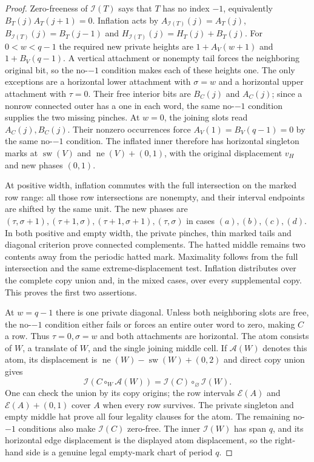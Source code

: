 \documentclass[11pt,a4paper]{amsart}
\numberwithin{equation}{section}
\theoremstyle{plain}
\theoremstyle{definition}
\begin{document}
\begin{proof}
Zero-freeness of \(\mathcal I(T)\) says that \(T\) has no index \(-1\), equivalently
\(B_T(j)A_T(j+1)=0\).  Inflation acts by
\(A_{\mathcal I(T)}(j)=A_T(j)\),
\(B_{\mathcal I(T)}(j)=B_T(j-1)\) and
\(H_{\mathcal I(T)}(j)=H_T(j)+B_T(j)\).
For \(0<w<q-1\) the required new private heights are
\(1+A_V(w+1)\) and \(1+B_V(q-1)\).  A vertical attachment or nonempty tail forces
the neighboring original bit, so the no-\(-1\) condition makes each of these
heights one.  The only exceptions are a horizontal lower attachment with
\(\sigma=w\) and a horizontal upper attachment with \(\tau=0\).  Their free interior
bits are \(B_C(j)\) and \(A_C(j)\); since a nonrow connected outer has a one in
each word, the same no-\(-1\) condition supplies the two missing pinches.
At \(w=0\), the joining slots read \(A_C(j),B_C(j)\).
Their nonzero occurrences force \(A_V(1)=B_V(q-1)=0\) by the
same no-\(-1\) condition.  The inflated inner therefore has horizontal
singleton marks at \(\operatorname{sw}(V)\) and
\(\operatorname{ne}(V)+(0,1)\), with the original displacement \(v_H\)
and new phases \((0,1)\).

At positive width, inflation commutes with the full intersection on the marked row range:
all those row intersections are nonempty, and their interval endpoints are
shifted by the same unit.  The new phases are
\((\tau,\sigma+1),(\tau+1,\sigma),(\tau+1,\sigma+1),(\tau,\sigma)\)
in cases \((a),(b),(c),(d)\).  In both positive and empty width,
the private pinches, thin marked tails and diagonal criterion prove
connected complements.  The hatted middle
remains two contents away from the periodic hatted mark.  Maximality follows
from the full intersection and the same extreme-displacement test.  Inflation
distributes over the complete copy union and, in the mixed cases, over every
supplemental copy.  This proves the first two assertions.

At \(w=q-1\) there is one private diagonal.  Unless both neighboring slots are
free, the no-\(-1\) condition either fails or forces an entire outer word to
zero, making \(C\) a row.  Thus \(\tau=0,\sigma=w\) and both attachments are horizontal.
The atom consists of \(W\), a translate of \(W\), and the single joining middle
cell.  If \(\mathcal A(W)\) denotes this atom, its displacement is
\(\operatorname{ne}(W)-\operatorname{sw}(W)+(0,2)\) and direct copy union gives
\[
 \mathcal I(C\circ_W\mathcal A(W))
   =\mathcal I(C)\circ_\varnothing\mathcal I(W).
\]
One can check the union by its copy origins; the row intervals
\(\mathcal E(A)\) and \(\mathcal E(A)+(0,1)\) cover \(A\) when every row survives.
The private singleton and empty middle hat prove all four legality clauses
for the atom.  The remaining no-\(-1\) conditions also make \(\mathcal I(C)\)
zero-free.
The inner \(\mathcal I(W)\) has span \(q\), and its horizontal
edge displacement is the displayed atom displacement, so the right-hand
side is a genuine legal empty-mark chart of period \(q\).
\end{proof}
\end{document}
